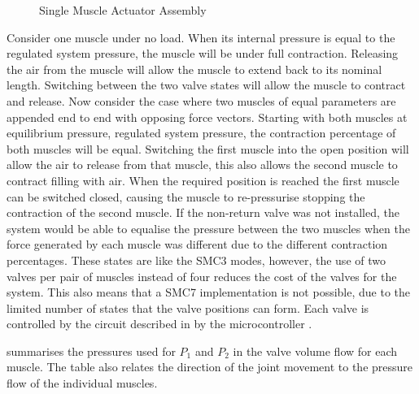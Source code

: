 \documentclass[11pt,a4paper]{article}
\begin{document}
\begin{figure}[!hbt]
{
    }
        \caption{Single Muscle Actuator Assembly}
    \label{fig:pneumatic_valve}
\end{figure}

Consider one muscle under no load. When its internal pressure is equal to the regulated system pressure, the muscle will be under full contraction. Releasing the air from the muscle will allow the muscle to extend back to its nominal length. Switching between the two valve states will allow the muscle to contract and release. 
Now consider the case where two muscles of equal parameters are appended end to end with opposing force vectors. Starting with both muscles at equilibrium pressure, regulated system pressure, the contraction percentage of both muscles will be equal. Switching the first muscle into the open position will allow the air to release from that muscle, this also allows the second muscle to contract filling with air. When the required position is reached the first muscle can be switched closed, causing the muscle to re-pressurise stopping the contraction of the second muscle. 
If the non-return valve was not installed, the system would be able to equalise the pressure between the two muscles when the force generated by each muscle was different due to the different contraction percentages. These states  are like the SMC3 modes, however, the use of two valves per pair of muscles instead of four reduces the cost of the valves for the system. This also means that a SMC7 implementation is not possible, due to the limited number of states that the valve positions can form.
Each valve is controlled by the circuit described in  by the microcontroller . \newline

 summarises the pressures used for $P_1$ and $P_2$ in the valve volume flow  for each muscle. The table also relates the direction of the joint movement to the pressure flow of the individual muscles.
\end{document}
